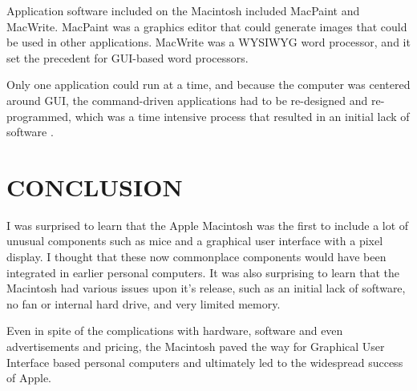 \documentclass[letterpaper, 10 pt, conference]{IEEEconf}
\begin{document}
Application software included on the Macintosh included MacPaint and MacWrite.  MacPaint was a graphics editor that could generate images that could be used in other applications.  MacWrite was a WYSIWYG word processor, and it set the precedent for GUI-based word processors.

Only one application could run at a time, and because the computer was centered around GUI, the command-driven applications had to be re-designed and re-programmed, which was a time intensive process that resulted in an initial lack of software \cite{MacHardware}.

\section{CONCLUSION}

I was surprised to learn that the Apple Macintosh was the first to include a lot of unusual components such as mice and a graphical user interface with a pixel display.  I thought that these now commonplace components would have been integrated in earlier personal computers.  It was also surprising to learn that the Macintosh had various issues upon it's release, such as an initial lack of software, no fan or internal hard drive, and very limited memory.

Even in spite of the complications with hardware, software and even advertisements and pricing, the Macintosh paved the way for Graphical User Interface based personal computers and ultimately led to the widespread success of Apple.




\end{document}
